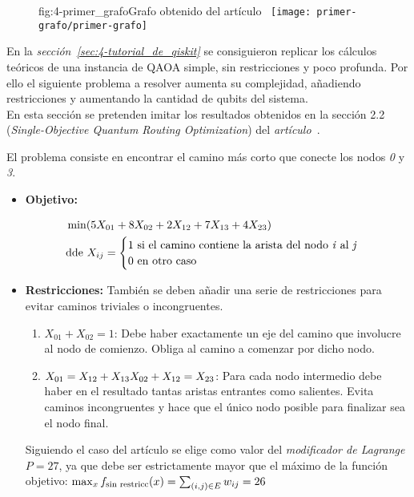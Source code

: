 \begin{figure}[htbp]{fig:4-primer_grafo}{Grafo obtenido del artículo~\cite{multi-objective_routing_optimization}}
  \centering
  \texttt{[image: primer-grafo/primer-grafo]}
\end{figure}

En la \textit{sección~\ref{sec:4-tutorial_de_qiskit}} se consiguieron replicar los cálculos teóricos de una instancia de QAOA simple, sin restricciones y poco profunda. Por ello el siguiente problema a resolver aumenta su complejidad, añadiendo restricciones y aumentando la cantidad de qubits del sistema. \\
En esta sección se pretenden imitar los resultados obtenidos en la sección 2.2 (\textit{Single-Objective Quantum Routing Optimization}) del \textit{artículo~\cite{multi-objective_routing_optimization}}.

El problema consiste en encontrar el camino más corto que conecte los nodos \textit{0} y \textit{3}.
\begin{itemize}
\item \textbf{Objetivo:}

  \begin{align*}
    &\min(5X_{01} + 8X_{02} + 2X_{12} + 7X_{13} + 4X_{23}) \\
    &\textnormal{dde } X_{ij} = \begin{cases}
      1 \textnormal{ si el camino contiene la arista del nodo \textit{i} al \textit{j}} \\
      0 \textnormal{ en otro caso}
    \end{cases}
  \end{align*}
  
\item \textbf{Restricciones:}
  También se deben añadir una serie de restricciones para evitar caminos triviales o incongruentes.

  \begin{enumerate}
  \item\label{it:4-primer_grafo_restriccion_ini} $X_{01} + X_{02} = 1$:
    Debe haber exactamente un eje del camino que involucre al nodo de comienzo.
    Obliga al camino a comenzar por dicho nodo.

  \item\label{it:4-primer_grafo_restriccion_inter} $X_{01} = X_{12} + X_{13} \\
    X_{02} + X_{12} = X_{23}$:
    Para cada nodo intermedio debe haber en el resultado tantas aristas entrantes como salientes.
    Evita caminos incongruentes y hace que el único nodo posible para finalizar sea el nodo final.
  \end{enumerate}

  Siguiendo el caso del artículo se elige como valor del \textit{modificador de Lagrange} \(P=27\), ya que debe ser estrictamente mayor que el máximo de la función objetivo:
  \(\max_{x}{f_{\textnormal{sin restricc}}(x)} = \sum_{(i, j)\in{E}}{w_{ij}} = 26\)

\end{itemize}

